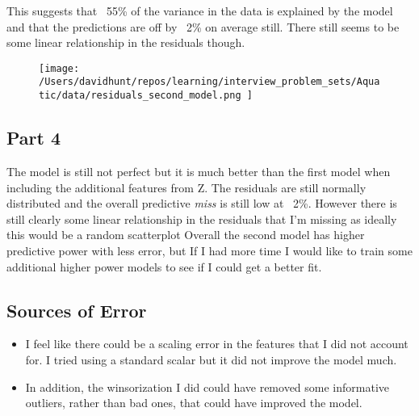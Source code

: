 \documentclass{article}
\begin{document}
This suggests that ~55\% of the variance in the data is explained by the model and that the predictions are off by ~2\% on average still.
There still seems to be some linear relationship in the residuals though. 
\begin{figure}[h!]  %
    \centering  %
    \texttt{[image: /Users/davidhunt/repos/learning/interview\_problem\_sets/Aquatic/data/residuals\_second\_model.png ]}  %
\end{figure}

\subsection*{Part 4}
The model is still not perfect but it is much better than the first model when including the additional features from Z.
The residuals are still normally distributed and the overall predictive \textit{miss} is still low at ~2\%.
However there is still clearly some linear relationship in the residuals that I'm missing as ideally this would be a random scatterplot
Overall the second model has higher predictive power with less error, but If I had more time I would like to train some additional higher power models to see if I could get a better fit.

\subsection*{Sources of Error}
\begin{itemize}
    \item I feel like there could be a scaling error in the features that I did not account for. I tried using a standard scalar but it did not improve the model much. 
    \item In addition, the winsorization I did could have removed some informative outliers, rather than bad ones, that could have improved the model.
    \end{itemize}
\end{document}
